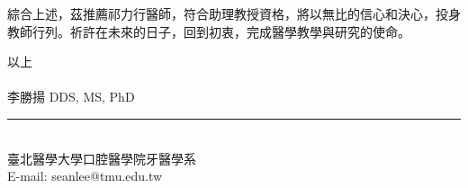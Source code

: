 \documentclass{letter}
\begin{document}
\begin{letter}

綜合上述，茲推薦祁力行醫師，符合助理教授資格，將以無比的信心和決心，投身教師行列。祈許在未來的日子，回到初衷，完成醫學教學與研究的使命。

\medskip
以上 \\ \\
李勝揚 DDS, MS, PhD\hspace{3mm} \rule[-1mm]{7cm}{0.15mm} \\%
臺北醫學大學口腔醫學院牙醫學系\\
E-mail: seanlee@tmu.edu.tw\\[0.5cm]





\clearpage

%


\end{letter}
\end{document}
